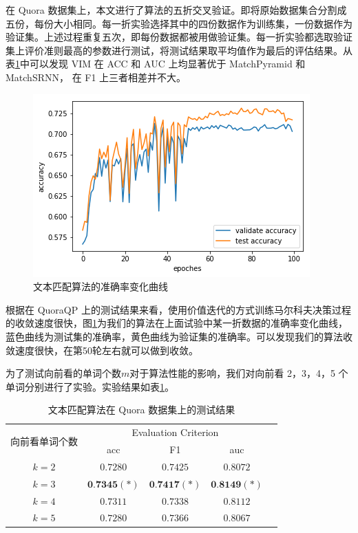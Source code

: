 在 Quora 数据集上，本文进行了算法的五折交叉验证。即将原始数据集合分割成五份，每份大小相同。每一折实验选择其中的四份数据作为训练集，一份数据作为验证集。上述过程重复五次，即每份数据都被用做验证集。每一折实验都选取验证集上评价准则最高的参数进行测试，将测试结果取平均值作为最后的评估结果。从表\ref{tab:MDP_test}中可以发现 VIM 在 ACC 和 AUC 上均显著优于 MatchPyramid 和 MatchSRNN， 在 F1 上三者相差并不大。

\begin{figure}[!htbp]
\vspace{1em}
\centering
  \includegraphics[width=0.7\linewidth]{figures/value_iter_line}
  \caption{文本匹配算法的准确率变化曲线}
  \label{fig:value_iter_line}       %
\vspace{1em}
\end{figure}


根据在 QuoraQP 上的测试结果来看，使用价值迭代的方式训练马尔科夫决策过程的收敛速度很快，图\ref{fig:value_iter_line}为我们的算法在上面试验中某一折数据的准确率变化曲线，蓝色曲线为测试集的准确率，黄色曲线为验证集的准确率。可以发现我们的算法收敛速度很快，在第50轮左右就可以做到收敛。


为了测试向前看的单词个数$m$对于算法性能的影响，我们对向前看 2，3，4，5 个单词分别进行了实验。实验结果如表\ref{tab:MDP_test}。
\begin{table}[htbp]
\caption{文本匹配算法在 Quora 数据集上的测试结果}\label{tab:MDP_test}
\vspace{0.5em}\centering\wuhao
\begin{tabular}{ccccc}
\toprule[1.5pt]
	\multirow{2}{*}{向前看单词个数} &
        \multicolumn{3}{c}{\multirow{1}{*}{Evaluation Criterion}} \\
        \cline{2-4} & acc & F1 & auc \\
        \hline
        $k=2$ & $0.7280$ & $0.7425$ & $0.8072$ \\
        $k=3$ & $\textbf{0.7345}(*)$ & $\textbf{0.7417}(*)$ & $\textbf{0.8149}(*)$ \\
        $k=4$ & $0.7311$ & $0.7338$ & $0.8112$\\
        $k=5$ & $0.7280$ & $0.7366$ & $0.8067$\\
        \bottomrule[1.5pt]
\end{tabular}
\vspace{\baselineskip}
\end{table}


